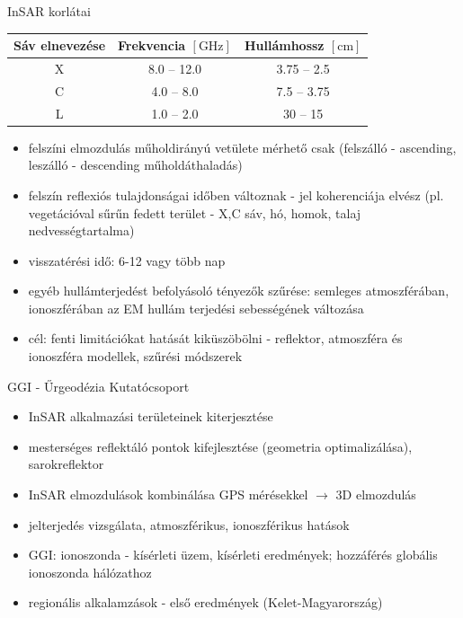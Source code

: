 \documentclass{beamer}
\begin{document}
\begin{frame}{InSAR korlátai}

\begin{table}
\begin{tabular}{c | c | c}
Sáv elnevezése & Frekvencia $[\text{GHz}]$ & Hullámhossz $[\text{cm}]$ \\ \hline
X & 8.0 -- 12.0 & 3.75 -- 2.5 \\ \hline
C & 4.0 -- 8.0 & 7.5 -- 3.75 \\ \hline
L & 1.0 -- 2.0 & 30 -- 15 \\ \hline
\end{tabular}
\end{table}

\begin{itemize}
    \item felszíni elmozdulás műholdirányú vetülete mérhető csak
    (felszálló - ascending, leszálló - descending műholdáthaladás)
    \item felszín reflexiós tulajdonságai időben változnak - jel koherenciája
    elvész (pl. vegetációval sűrűn fedett terület - X,C sáv, hó, homok, talaj
    nedvességtartalma)
    \item visszatérési idő: 6-12 vagy több nap
    \item egyéb hullámterjedést befolyásoló tényezők szűrése: semleges
    atmoszférában, ionoszférában az EM hullám terjedési sebességének változása
    \item cél: fenti limitációkat hatását kiküszöbölni - reflektor, atmoszféra
    és ionoszféra modellek, szűrési módszerek
\end{itemize}

\end{frame}


\begin{frame}{GGI - Űrgeodézia Kutatócsoport}

\begin{itemize}
    \item InSAR alkalmazási területeinek kiterjesztése
    \item mesterséges reflektáló pontok kifejlesztése
    (geometria optimalizálása), sarokreflektor
    \item InSAR elmozdulások kombinálása GPS mérésekkel $\rightarrow$ 3D elmozdulás
    \item jelterjedés vizsgálata, atmoszférikus, ionoszférikus hatások
    \item GGI: ionoszonda - kísérleti üzem, kísérleti eredmények; hozzáférés
    globális ionoszonda hálózathoz
    \item regionális alkalamzások - első eredmények (Kelet-Magyarország)
\end{itemize}

\end{frame}
\end{document}

